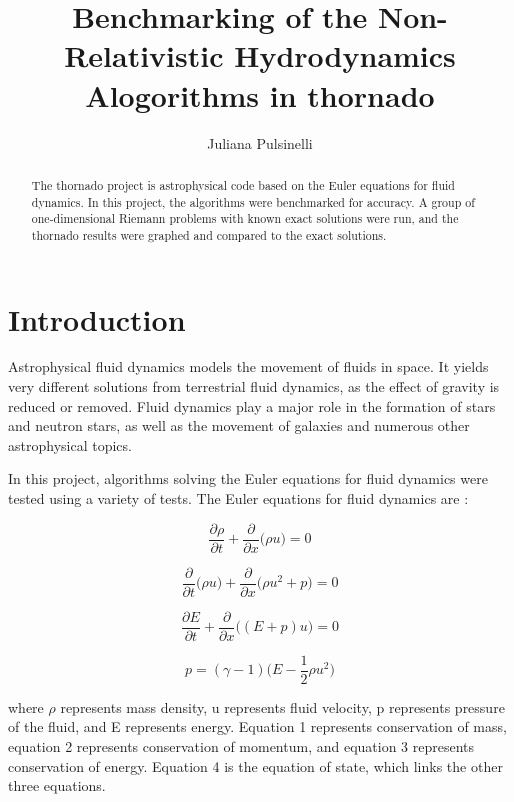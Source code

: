 \documentclass[letterpaper,12pt]{article}
\author{Juliana Pulsinelli}
\title{Benchmarking of the Non-Relativistic Hydrodynamics Alogorithms in thornado}
\begin{document}
\maketitle
\begin{abstract}

The thornado project is astrophysical code based on the Euler equations for fluid dynamics. In this project, the algorithms were benchmarked for accuracy. A group of one-dimensional Riemann problems with known exact solutions were run, and the thornado results were graphed and compared to the exact solutions. 

\end{abstract}
\section{Introduction}
Astrophysical fluid dynamics models the movement of fluids in space. It yields very different solutions from terrestrial fluid dynamics, as the effect of gravity is reduced or removed. 
Fluid dynamics play a major role in the formation of stars and neutron stars, as well as the movement of galaxies and numerous other astrophysical topics.  

In this project, algorithms solving the Euler equations for fluid dynamics were tested using a variety of tests. The Euler equations for fluid dynamics are \cite{ZhangShu2010}:


\begin{equation}
	\frac{\partial \rho}{\partial t}  
	+ \frac{\partial}{\partial x} \Big(\rho u\Big) = 0
\end{equation}

\begin{equation}
	\frac{\partial}{\partial t} \Big(\rho u\Big)
	+ \frac{\partial}{\partial x} \Big(\rho u^2 + p\Big) = 0
\end{equation}

\begin{equation}
	\frac{\partial E}{\partial t}
	+ \frac{\partial}{\partial x} \Big((E + p) u\Big) = 0
\end{equation}

\begin{equation}
	p = (\gamma - 1)
	\Big(E - \frac{1}{2} \rho u^2 \Big)
\end{equation}

where $\rho$ represents mass density, u represents fluid velocity, p represents pressure of the fluid, and E represents energy. 
Equation 1 represents conservation of mass, equation 2 represents conservation of momentum, and equation 3 represents conservation of energy. Equation 4 is the equation of state, which links the other three equations. 
\end{document}
